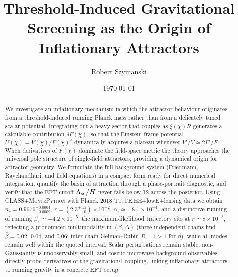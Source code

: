 \documentclass[11pt,a4paper]{article}
\title{Threshold-Induced Gravitational Screening as the Origin of Inflationary Attractors}
\author{Robert Szymanski}
\date{\today}
\begin{document}
\maketitle

\begin{abstract}
We investigate an inflationary mechanism in which the attractor behaviour originates from a threshold-induced running Planck mass rather than from a delicately tuned scalar potential. Integrating out a heavy sector that couples as $\xi(\chi) R$ generates a calculable contribution $\delta F(\chi)$, so that the Einstein-frame potential $U(\chi)=V(\chi)/F(\chi)^2$ dynamically acquires a plateau whenever $V'/V\simeq2F'/F$. When derivatives of $F(\chi)$ dominate the field-space metric the theory approaches the universal pole structure of single-field attractors, providing a dynamical origin for attractor geometry. We formulate the full background system (Friedmann, Raychaudhuri, and field equations) in a compact form ready for direct numerical integration, quantify the basin of attraction through a phase-portrait diagnostic, and verify that the EFT cutoff $\Lambda_{\rm sc}/H$ never falls below 12 across the posterior. Using \textsc{CLASS}+\textsc{MontePython} with Planck 2018 TT,TE,EE+lowE+lensing data we obtain $n_s=0.9676^{+0.0004}_{-0.0009}$, $r=(2.3^{+1.5}_{-1.0})\times10^{-2}$, $\alpha_s\simeq-8.1\times10^{-4}$, and a distinctive running of running $\beta_s\simeq-4.2\times10^{-5}$; the maximum-likelihood trajectory sits at $r\simeq8\times10^{-3}$, reflecting a pronounced multimodality in $(\beta,\Delta)$ (three independent chains find $\bar\beta=0.02$, $0.04$, and $0.06$; inter-chain Gelman--Rubin $R{-}1>1$ for $\beta$), while all modes remain well within the quoted interval. Scalar perturbations remain stable, non-Gaussianity is unobservably small, and cosmic microwave background observables directly probe derivatives of the gravitational coupling, linking inflationary attractors to running gravity in a concrete EFT setup.
\end{abstract}
\end{document}
